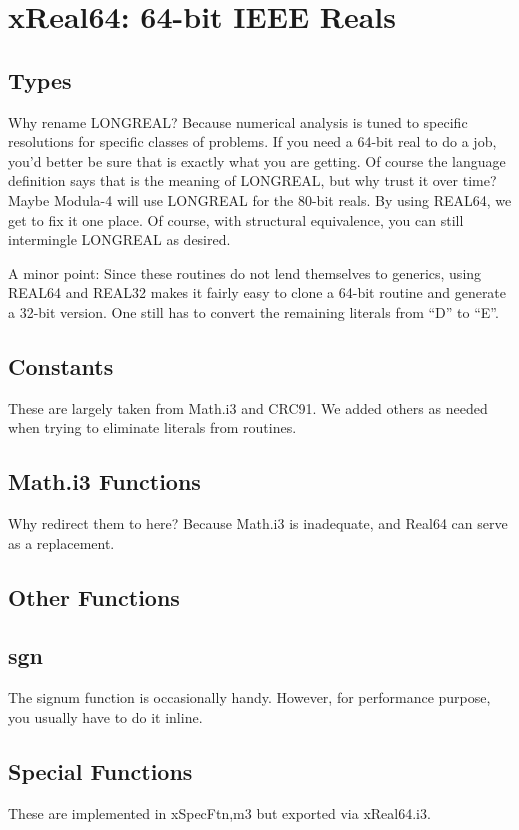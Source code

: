 \section{xReal64: 64-bit IEEE Reals}
\subsection{Types}
Why rename LONGREAL?  Because numerical analysis is tuned to specific
resolutions for specific classes of problems.  If you need a 64-bit real
to do a job, you'd better be sure that is exactly what you are getting.
Of course the language definition says that is the meaning of LONGREAL,
but why trust it over time?  Maybe Modula-4 will use LONGREAL for
the 80-bit reals.  By using REAL64, we get to fix it one place.
Of course, with structural equivalence, you can still intermingle
LONGREAL as desired.

A minor point:  Since these routines do not lend themselves to
generics, using REAL64 and REAL32 makes it fairly easy to clone
a 64-bit routine and generate a 32-bit version.  One still has to
convert the remaining literals from ``D'' to ``E''.

\subsection{Constants}
These are largely taken from Math.i3 and CRC91.
We added others as needed when trying
to eliminate literals from routines.

\subsection{Math.i3 Functions}
Why redirect them to here?  Because Math.i3 is inadequate, and
Real64 can serve as a replacement.

\subsection{Other Functions}
\subsection*{sgn}
The signum function is occasionally handy.  However, for
performance purpose, you usually have to do it inline.

\subsection{Special Functions}
These are implemented in xSpecFtn,m3 but exported via xReal64.i3.

